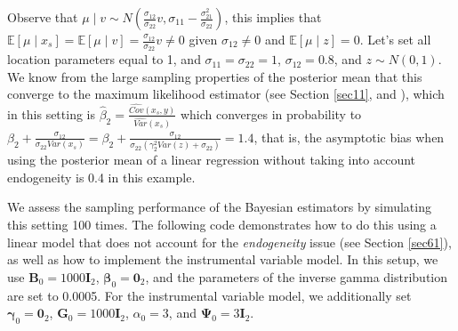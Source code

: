 Observe that $\mu\mid v\sim N\left(\frac{\sigma_{12}}{\sigma_{22}}v,\sigma_{11}-\frac{\sigma_{21}^2}{\sigma_{22}}\right)$, this implies that $\mathbb{E}[\mu\mid x_s]=\mathbb{E}[\mu\mid v]=\frac{\sigma_{12}}{\sigma_{22}}v\neq 0$ given $\sigma_{12}\neq 0$ and $\mathbb{E}[\mu\mid z]=0$.
Let's set all location parameters equal to 1, and $\sigma_{11}=\sigma_{22}=1$, $\sigma_{12}=0.8$, and $z\sim N(0,1)$. We know from the large sampling properties of the posterior mean that this converge to the maximum likelihood estimator (see Section \ref{sec11}, and \cite{Lehmann2003,van2000asymptotic}), which in this setting is $\hat{\beta}_2=\frac{\widehat{Cov}(x_s,y)}{\widehat{Var}(x_s)}$ which converges in probability to $\beta_2+\frac{\sigma_{12}}{\sigma_{22}Var(x_s)}=\beta_2+\frac{\sigma_{12}}{\sigma_{22}(\gamma_2^2Var(z)+\sigma_{22})}=1.4$, that is, the asymptotic bias when using the posterior mean of a linear regression without taking into account endogeneity is 0.4 in this example.

We assess the sampling performance of the Bayesian estimators by simulating this setting 100 times. The following code demonstrates how to do this using a linear model that does not account for the \textit{endogeneity} issue (see Section \ref{sec61}), as well as how to implement the instrumental variable model. In this setup, we use \( \bm{B}_0 = 1000 \bm{I}_2 \), \( \bm{\beta}_0 = \bm{0}_2 \), and the parameters of the inverse gamma distribution are set to 0.0005. For the instrumental variable model, we additionally set \( \bm{\gamma}_0 = \bm{0}_2 \), \( \bm{G}_0 = 1000 \bm{I}_2 \), \( \alpha_0 = 3 \), and \( \bm{\Psi}_0 = 3 \bm{I}_2 \).

